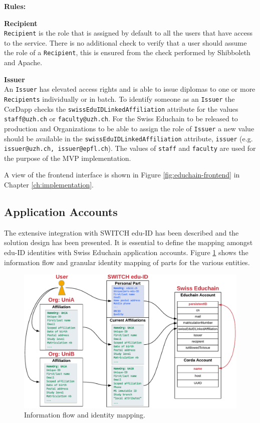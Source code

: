 \begin{description}
	\textbf{Rules:}
	\begin{description}
		\item\textbf{Recipient} \hfill \\
		\texttt{Recipient} is the role that is assigned by default to all the users that have access to the service. There is no additional check to verify that a user should assume the role of a \texttt{Recipient}, this is ensured from the check performed by Shibboleth and Apache.
		\item\textbf{Issuer} \hfill \\
		An \texttt{Issuer} has elevated access rights and is able to issue diplomas to one or more \texttt{Recipients} individually or in batch. To identify someone as an \texttt{Issuer} the CorDapp checks the \texttt{swissEduIDLinkedAffiliation} attribute for the values \texttt{staff@uzh.ch} or \texttt{faculty@uzh.ch}. For the Swiss Educhain to be released to production and Organizations to be able to assign the role of \texttt{Issuer} a new value should be available in the \texttt{swissEduIDLinkedAffiliation} attribute, \texttt{issuer} (e.g. \texttt{issuer@uzh.ch, issuer@epfl.ch}). The values of \texttt{staff} and \texttt{faculty} are used for the purpose of the MVP implementation.
	\end{description}

	A view of the frontend interface is shown in Figure \ref{fig:educhain-frontend} in Chapter \ref{ch:implementation}.
\end{description}


\subsection{Application Accounts} \label{ssec:iam-application-accounts}

The extensive integration with SWITCH edu-ID has been described and the solution design has been presented. It is essential to define the mapping amongst edu-ID identities with Swiss Educhain application accounts. Figure \ref{fig:identity-mapping} shows the information flow and granular identity mapping of parts for the various entities.

\begin{figure}[H]
	\centering
	\includegraphics[width=\textwidth]{figs/ch4/identity-mapping}
	\caption{Information flow and identity mapping.}
	\label{fig:identity-mapping}
\end{figure}

